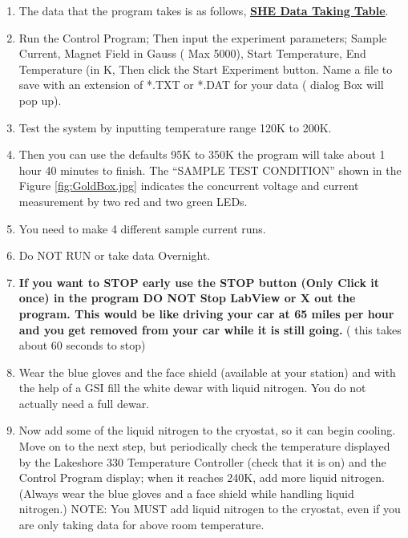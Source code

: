 \documentclass{../lab}
\begin{document}
\begin{enumerate}
    \item The data that the program takes is as follows, \href{http://experimentationlab.berkeley.edu/sites/default/files/images/SHE\_Data\_Taking\_Table.pdf}{\textbf{SHE Data Taking Table}}.

    \item Run the Control Program; Then input the experiment parameters; Sample Current, Magnet Field in Gauss ( Max 5000), Start Temperature, End Temperature (in K, Then click the Start Experiment button. Name a file to save with an extension of *.TXT or *.DAT for your data ( dialog Box will pop up).

    \item Test the system by inputting temperature range 120K to 200K.
    

    \item Then you can use the defaults 95K to 350K the program will take about 1 hour 40 minutes to finish. The ``SAMPLE TEST CONDITION'' shown in the Figure \ref{fig:GoldBox.jpg} indicates the concurrent voltage and current measurement by two red and two green LEDs.

    \item You need to make 4 different sample current runs.

    \item Do NOT RUN or take data Overnight.

    \item \textbf{If you want to STOP early use the STOP button (Only Click it once) in the program DO NOT Stop LabView or X out the program. This would be like driving your car at 65 miles per hour and you get removed from your car while it is still going.} ( this takes about 60 seconds to stop)

    \item Wear the blue gloves and the face shield (available at your station) and with the help of a GSI fill the white dewar with liquid nitrogen. You do not actually need a full dewar.

    \item Now add some of the liquid nitrogen to the cryostat, so it can begin cooling. Move on to the next step, but periodically check the temperature displayed by the Lakeshore 330 Temperature Controller (check that it is on) and the Control Program display; when it reaches 240K, add more liquid nitrogen.(Always wear the blue gloves and a face shield while handling liquid nitrogen.) NOTE: You MUST add liquid nitrogen to the cryostat, even if you are only taking data for above room temperature.


\end{enumerate}
\end{document}
